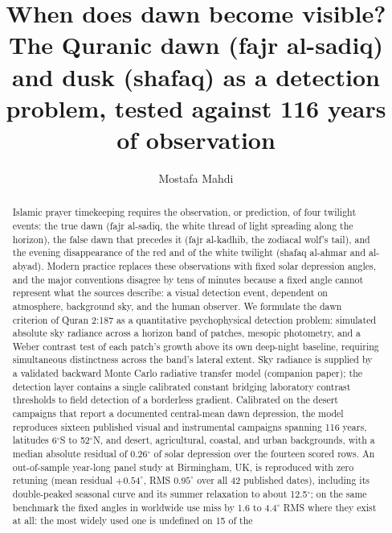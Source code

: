 \documentclass[preprint,12pt]{elsarticle}
\begin{document}
\begin{frontmatter}

\title{When does dawn become visible? The Quranic dawn (fajr al-sadiq)
and dusk (shafaq) as a detection problem, tested against 116 years of
observation}

\author[ku]{Mostafa Mahdi}

\begin{abstract}
Islamic prayer timekeeping requires the observation, or prediction, of
four twilight events: the true dawn (fajr al-sadiq, the white thread of
light spreading along the horizon), the false dawn that precedes it (fajr
al-kadhib, the zodiacal wolf's tail), and the evening disappearance of the
red and of the white twilight (shafaq al-ahmar and al-abyad). Modern
practice replaces these observations with fixed solar depression angles,
and the major conventions disagree by tens of minutes because a fixed
angle cannot represent what the sources describe: a visual detection
event, dependent on atmosphere, background sky, and the human observer.
We formulate the dawn criterion of Quran 2:187 as a quantitative
psychophysical detection problem: simulated absolute sky radiance across
a horizon band of patches, mesopic photometry, and a Weber contrast test
of each patch's growth above its own deep-night baseline, requiring
simultaneous distinctness across the band's lateral extent. Sky radiance
is supplied by a validated backward Monte Carlo radiative transfer model
(companion paper); the detection layer contains a single calibrated
constant bridging laboratory contrast thresholds to field detection of a
borderless gradient. Calibrated on the desert campaigns that report a
documented central-mean dawn depression, the model reproduces sixteen
published visual and instrumental
campaigns spanning 116 years, latitudes 6$^\circ$S to 52$^\circ$N, and
desert, agricultural, coastal, and urban backgrounds, with a median
absolute residual of 0.26$^\circ$ of solar depression over the fourteen
scored rows. An out-of-sample
year-long panel study at Birmingham, UK, is reproduced with zero
retuning (mean residual $+0.54^{\circ}$, RMS $0.95^{\circ}$ over all
42 published dates), including its double-peaked seasonal curve and
its summer relaxation to about 12.5$^\circ$; on the same benchmark the
fixed angles in worldwide use miss by 1.6 to 4.4$^{\circ}$ RMS where
they exist at all: the most widely used one is undefined on 15 of the

\end{abstract}
\end{frontmatter}
\end{document}
